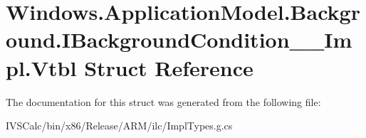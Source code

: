 \hypertarget{struct_windows_1_1_application_model_1_1_background_1_1_i_background_condition_____impl_1_1_vtbl}{}\section{Windows.\+Application\+Model.\+Background.\+I\+Background\+Condition\+\_\+\+\_\+\+Impl.\+Vtbl Struct Reference}
\label{struct_windows_1_1_application_model_1_1_background_1_1_i_background_condition_____impl_1_1_vtbl}


The documentation for this struct was generated from the following file\+:\begin{DoxyCompactItemize}
\item 
I\+V\+S\+Calc/bin/x86/\+Release/\+A\+R\+M/ilc/Impl\+Types.\+g.\+cs\end{DoxyCompactItemize}
